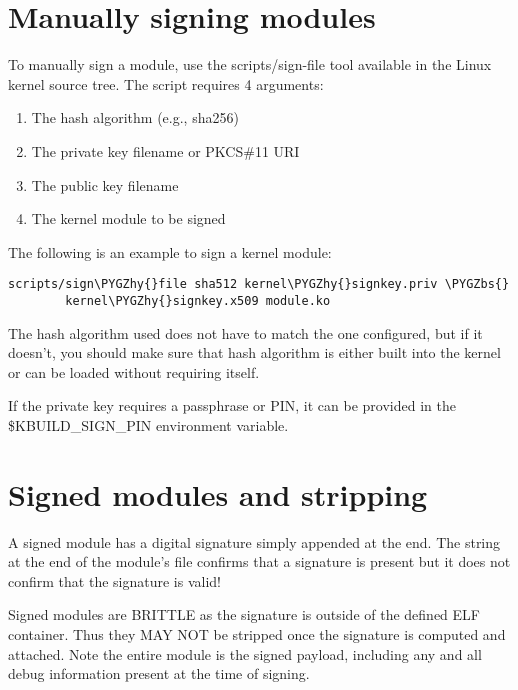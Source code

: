 \documentclass[a4paper,8pt,english]{sphinxmanual}
\def\PYGZbs{\char`\\}
\def\PYGZhy{\char`\-}
\begin{document}
\section{Manually signing modules}
\label{admin-guide/module-signing:manually-signing-modules}
To manually sign a module, use the scripts/sign-file tool available in
the Linux kernel source tree.  The script requires 4 arguments:
\begin{enumerate}
\item {} 
The hash algorithm (e.g., sha256)

\item {} 
The private key filename or PKCS\#11 URI

\item {} 
The public key filename

\item {} 
The kernel module to be signed

\end{enumerate}

The following is an example to sign a kernel module:

\begin{Verbatim}[commandchars=\\\{\}]
scripts/sign\PYGZhy{}file sha512 kernel\PYGZhy{}signkey.priv \PYGZbs{}
        kernel\PYGZhy{}signkey.x509 module.ko
\end{Verbatim}

The hash algorithm used does not have to match the one configured, but if it
doesn't, you should make sure that hash algorithm is either built into the
kernel or can be loaded without requiring itself.

If the private key requires a passphrase or PIN, it can be provided in the
\$KBUILD\_SIGN\_PIN environment variable.


\section{Signed modules and stripping}
\label{admin-guide/module-signing:signed-modules-and-stripping}
A signed module has a digital signature simply appended at the end.  The string
 at the end of the module's file confirms that a
signature is present but it does not confirm that the signature is valid!

Signed modules are BRITTLE as the signature is outside of the defined ELF
container.  Thus they MAY NOT be stripped once the signature is computed and
attached.  Note the entire module is the signed payload, including any and all
debug information present at the time of signing.
\end{document}
